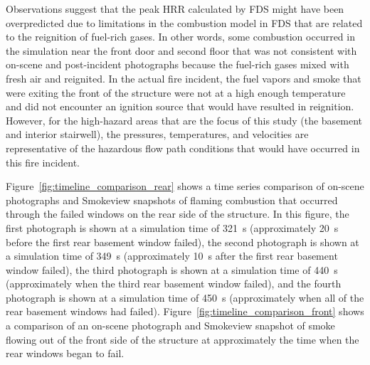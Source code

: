 \documentclass[12pt,oneside]{book}
\begin{document}
Observations suggest that the peak HRR calculated by FDS might have been overpredicted due to limitations in the combustion model in FDS that are related to the reignition of fuel-rich gases. In other words, some combustion occurred in the simulation near the front door and second floor that was not consistent with on-scene and post-incident photographs because the fuel-rich gases mixed with fresh air and reignited. In the actual fire incident, the fuel vapors and smoke that were exiting the front of the structure were not at a high enough temperature and did not encounter an ignition source that would have resulted in reignition. However, for the high-hazard areas that are the focus of this study (the basement and interior stairwell), the pressures, temperatures, and velocities are representative of the hazardous flow path conditions that would have occurred in this fire incident.

Figure~\ref{fig:timeline_comparison_rear} shows a time series comparison of on-scene photographs and Smokeview snapshots of flaming combustion that occurred through the failed windows on the rear side of the structure. In this figure, the first photograph is shown at a simulation time of 321~s (approximately 20~s before the first rear basement window failed), the second photograph is shown at a simulation time of 349~s (approximately 10~s after the first rear basement window failed), the third photograph is shown at a simulation time of 440~s (approximately when the third rear basement window failed), and the fourth photograph is shown at a simulation time of 450~s (approximately when all of the rear basement windows had failed). Figure~\ref{fig:timeline_comparison_front} shows a comparison of an on-scene photograph and Smokeview snapshot of smoke flowing out of the front side of the structure at approximately the time when the rear windows began to fail.
\end{document}
